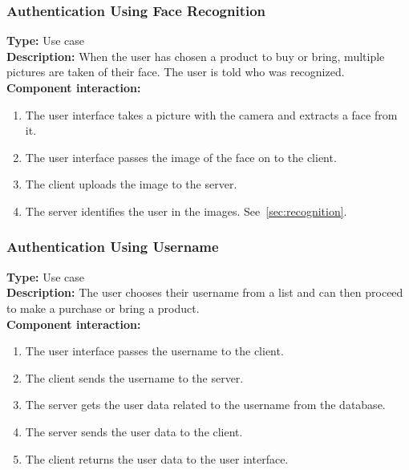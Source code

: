 \documentclass[11pt]{article}
\begin{document}
\subsubsection{Authentication Using Face Recognition}
\textbf{Type:} Use case\\
\textbf{Description:} When the user has chosen a product to buy or bring, 
multiple pictures are taken of their face. The user is told who was recognized. \\
\textbf{Component interaction:} 
\begin{enumerate} 
\item{The user interface takes a picture with the camera and extracts a face from it.}
\item{The user interface passes the image of the face on to the client.}
\item{The client uploads the image to the server.}
\item{The server identifies the user in the images. See~\ref{sec:recognition}.}
\end{enumerate}

\subsubsection{Authentication Using Username}
\textbf{Type:} Use case\\
\textbf{Description:} The user chooses their username from a list and can then proceed to make a purchase or bring a product.\\
\textbf{Component interaction:} 
\begin{enumerate} 
\item{The user interface passes the username to the client.}
\item{The client sends the username to the server.}
\item{The server gets the user data related to the username from the database.}
\item{The server sends the user data to the client.}
\item{The client returns the user data to the user interface.}
\end{enumerate}
\end{document}
